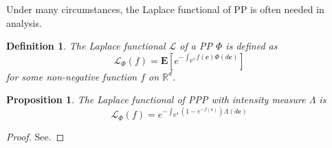 \documentclass[a4paper,twocolumn]{IEEEtran}
\newtheorem{definition}{\textbf{Definition}}
\newtheorem{proposition}{\textbf{Proposition}}
\begin{document}
Under many circumstances, the Laplace functional of PP is often needed in analysis.
\begin{definition}
The Laplace functional $\mathcal{L}$ of a PP $\Phi$ is defined as
\begin{displaymath}
\mathcal{L}_{\Phi}(f) = \mathbf{E}\left[ e^{-\int_{\mathbb{R}^d} f(\bm{c}) \Phi(d \bm{c})}\right]
\end{displaymath}
for some non-negative function $f$ on $\mathbb{R}^d$.
\end{definition}
\begin{proposition}
The Laplace functional of PPP with intensity measure $\Lambda$ is
\begin{equation}
\mathcal{L}_{\Phi}(f) = e^{-\int_{\mathbb{R}^d}(1-e^{-f(\bm{c})})\Lambda(d \bm{c})}
\end{equation}
\end{proposition}
\begin{proof}
See.
\end{proof}
\end{document}
